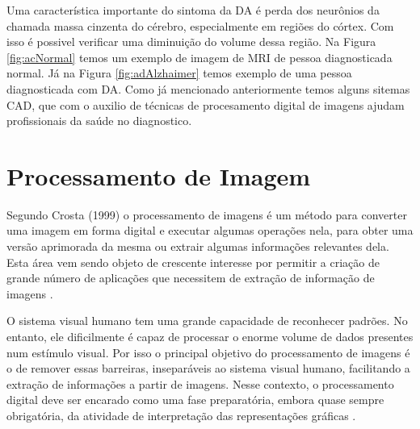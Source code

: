 \documentclass[openright]{UFRGS} %
\begin{document}
Uma característica importante do sintoma da DA é perda dos neurônios da chamada massa cinzenta do cérebro, especialmente em regiões do córtex. Com isso é possivel verificar uma diminuição do volume dessa região. 
Na Figura \ref{fig:acNormal}  temos um exemplo de imagem de MRI de pessoa diagnosticada normal. Já na 
Figura \ref{fig:adAlzhaimer}  temos exemplo de uma pessoa diagnosticada com DA. Como já mencionado anteriormente temos alguns sitemas CAD, que com o auxilio de técnicas de procesamento digital de imagens ajudam profissionais da saúde no diagnostico.


\section{Processamento de Imagem}

Segundo Crosta (1999) o processamento de imagens é um método para converter uma imagem em forma digital e executar algumas operações nela, para obter uma versão aprimorada da mesma ou extrair algumas informações relevantes dela. Esta área vem sendo objeto de crescente interesse por permitir a criação de grande número de aplicações que necessitem de extração de informação de imagens \cite{crosta1999processamento}.

O sistema visual humano tem uma grande capacidade de reconhecer padrões. No entanto, ele dificilmente é capaz de processar o enorme volume de dados presentes num estímulo visual. Por isso o principal objetivo do processamento de imagens é o de remover essas barreiras, inseparáveis ao sistema visual humano, facilitando a extração de informações a partir de imagens. Nesse contexto, o processamento digital deve ser encarado como uma fase preparatória, embora quase sempre obrigatória, da atividade de interpretação das representações gráficas \cite{crosta1999processamento}.
\end{document}
